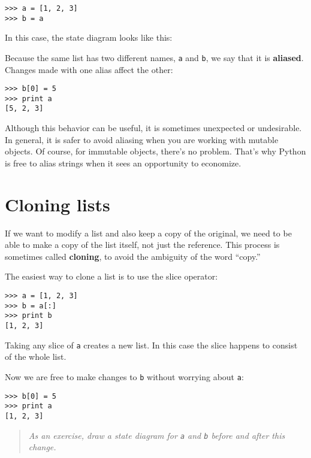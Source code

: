 \beforeverb
\begin{verbatim}
>>> a = [1, 2, 3]
>>> b = a
\end{verbatim}
\afterverb
%
In this case, the state diagram looks like this:

\beforefig
\centerline{}
\afterfig

Because the same list has two different names, {\tt a} and {\tt b}, we
say that it is {\bf aliased}.  Changes made with one alias affect
the other:

\beforeverb
\begin{verbatim}
>>> b[0] = 5
>>> print a
[5, 2, 3]
\end{verbatim}
\afterverb
%
Although this behavior can be useful, it is sometimes unexpected or
undesirable.  In general, it is safer to avoid aliasing when you
are working with mutable objects.  Of course, for immutable
objects, there's no problem.  That's why Python is free to
alias strings when it sees an opportunity to economize.


\section{Cloning lists}

If we want to modify a list and also keep a copy of the original, we
need to be able to make a copy of the list itself, not just the
reference.  This process is sometimes called {\bf cloning}, to avoid the
ambiguity of the word ``copy.''

The easiest way to clone a list is to use the slice operator:

\beforeverb
\begin{verbatim}
>>> a = [1, 2, 3]
>>> b = a[:]
>>> print b
[1, 2, 3]
\end{verbatim}
\afterverb
%
Taking any slice of {\tt a} creates a new list.  
In this case the slice happens to consist of the whole list.

Now we are free to make changes to {\tt b} without worrying about {\tt a}:

\beforeverb
\begin{verbatim}
>>> b[0] = 5
>>> print a
[1, 2, 3]
\end{verbatim}
\afterverb
%
\begin{quote}
{\em As an exercise, draw a state diagram for {\tt a} and {\tt b}
before and after this change.}
\end{quote}



